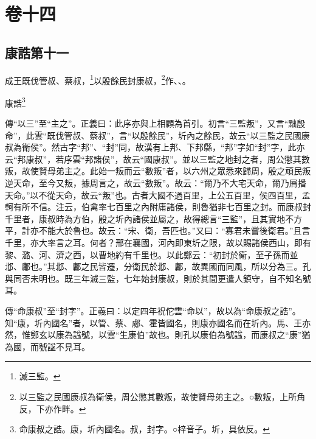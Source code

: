 

\chapter{卷十四}


\section{康誥第十一}


成王既伐管叔、蔡叔，\footnote{滅三監。}以殷餘民封康叔，\footnote{以三監之民國康叔為衛侯，周公懲其數叛，故使賢母弟主之。○數叛，上所角反，下亦作畔。}作、、。

康誥\footnote{命康叔之誥。康，圻內國名。叔，封字。○梓音子。圻，具依反。}


{\noindent\zhuan{}\fzbyks 傳“以三”至“主之”。正義曰：此序亦與上相顧為首引。初言“三監叛”，又言“黜殷命”，此雲“既伐管叔、蔡叔”，言“以殷餘民”，圻內之餘民，故云“以三監之民國康叔為衛侯”。然古字“邦”、“封”同，故漢有上邦、下邦縣，“邦”字如“封”字，此亦云“邦康叔”，若序雲“邦諸侯”，故云“國康叔”。並以三監之地封之者，周公懲其數叛，故使賢母弟主之。此始一叛而云“數叛”者，以六州之眾悉來歸周，殷之頑民叛逆天命，至今又叛，據周言之，故云“數叛”。故云：“爾乃不大宅天命，爾乃屑播天命。”以不從天命，故云“叛”也。古者大國不過百里，上公五百里，侯四百里，孟軻有所不信。注云，伯禽率七百里之內附庸諸侯，則魯猶非七百里之封。而康叔封千里者，康叔時為方伯，殷之圻內諸侯並屬之，故得總言“三監”，且其實地不方平，計亦不能大於魯也。故云：“宋、衛，吾匹也。”又曰：“寡君未嘗後衛君。”且言千里，亦大率言之耳。何者？邢在襄國，河內即東圻之限，故以賜諸侯西山，即有黎、潞、河、濟之西，以曹地約有千里也。以此鄭云：“初封於衛，至子孫而並邶、鄘也。”其邶、鄘之民皆遷，分衛民於邶、鄘，故異國而同風，所以分為三。孔與同否未明也。既三年滅三監，七年始封康叔，則於其間更遣人鎮守，自不知名號耳。 \par}

{\noindent\zhuan{}\fzbyks 傳“命康叔”至“封字”。正義曰：以定四年祝佗雲“命以”，故以為“命康叔之誥”。知“康，圻內國名”者，以管、蔡、郕、霍皆國名，則康亦國名而在圻內。馬、王亦然，惟鄭玄以康為諡號，以雲“生康伯”故也。則孔以康伯為號諡，而康叔之“康”猶為國，而號諡不見耳。 \par}

